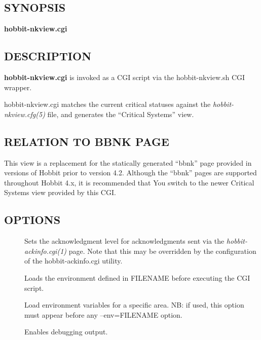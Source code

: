  \subsection{SYNOPSIS}
\textbf{hobbit-nkview.cgi}


 
\subsection{DESCRIPTION}
\textbf{hobbit-nkview.cgi}
 is invoked as a CGI script via the hobbit-nkview.sh CGI wrapper. 

  hobbit-nkview.cgi matches the current critical statuses against the \emph{hobbit-nkview.cfg(5)}
 file, and generates the ``Critical Systems'' view. 


 
\subsection{RELATION TO BBNK PAGE}
 This view is a replacement for the statically generated ``bbnk'' page
 provided in versions of Hobbit prior to version 4.2. Although the
 ``bbnk'' pages are supported throughout Hobbit 4.x, it is recommended
 that You switch to the newer Critical Systems view provided by this
 CGI. 


 
\subsection{OPTIONS}
\begin{description}
\item[] Sets the acknowledgment level for
  acknowledgments sent via the \emph{hobbit-ackinfo.cgi(1)} page. Note
  that this may be overridden by the configuration of the
  hobbit-ackinfo.cgi utility. 


 

\item[] Loads the environment defined in FILENAME before
  executing the CGI script. 


 

\item[] Load environment variables for a specific area. NB:
  if used, this option must appear before any --env=FILENAME option. 


 

\item[] Enables debugging output. 

 


\end{description}
